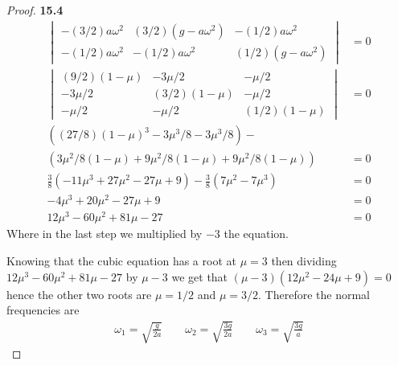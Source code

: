 \documentclass[11pt]{article}
\theoremstyle{definition}
\begin{document}
\begin{proof}{\textbf{15.4}}
\begin{align*}
\begin{vmatrix}
            - (3/2)a\omega^2 & (3/2)(g - a\omega^2) & -(1/2)a\omega^2\\
            -(1/2)a\omega^2 & -(1/2)a\omega^2 & (1/2)(g - a\omega^2)
        \end{vmatrix}
        &= 0\\
        \begin{vmatrix}
            (9/2)(1 - \mu) & - 3\mu/2 & -\mu/2\\
            - 3\mu/2 & (3/2)(1 - \mu) & -\mu/2\\
            -\mu/2 & -\mu/2 & (1/2)(1 - \mu)
        \end{vmatrix}
        &= 0\\
        ((27/8)(1 - \mu)^3 - 3\mu^3/8 - 3\mu^3/8)-\quad&\\
        (3\mu^2/8(1 - \mu) + 9\mu^2/8(1- \mu) + 9\mu^2/8 ( 1- \mu)) &= 0\\
        \frac{3}{8}\left(-11\mu^3 + 27\mu^2 - 27\mu + 9\right)
        - \frac{3}{8}\left(7\mu^2 - 7\mu^3\right)
        &= 0\\
        -4\mu^3 + 20\mu^2 - 27\mu + 9 &= 0\\
        12\mu^3 - 60\mu^2 + 81\mu - 27 &= 0
    \end{align*}
    Where in the last step we multiplied by $-3$ the equation.

    Knowing that the cubic equation has a root at $\mu = 3$ then dividing
    $12\mu^3 - 60\mu^2 + 81\mu - 27$ by $\mu - 3$ we get that
    $(\mu - 3)(12\mu^2 - 24\mu + 9) = 0$ hence the other two roots are
    $\mu = 1/2$ and $\mu = 3/2$. Therefore the normal frequencies are
    \begin{align*}
        \omega_1 = \sqrt{\frac{g}{2a}}\quad\quad
        \omega_2 = \sqrt{\frac{3g}{2a}}\quad\quad
        \omega_3 = \sqrt{\frac{3g}{a}}
    \end{align*}


\end{proof}
\end{document}
